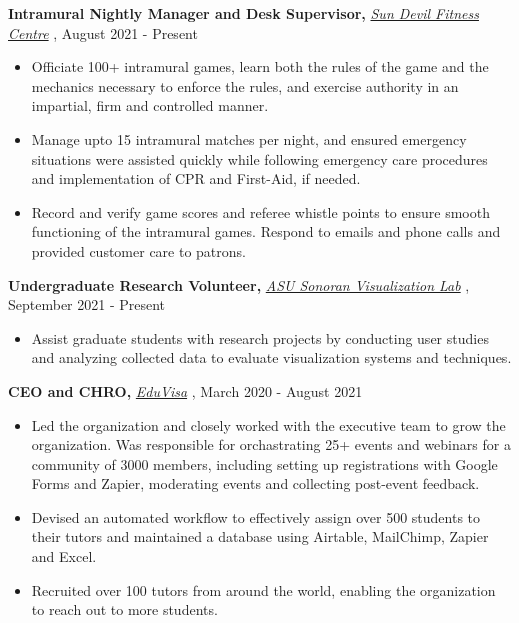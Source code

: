 \documentclass[a4paper]{article}
\begin{document}
    \textbf{Intramural Nightly Manager and Desk Supervisor, } \textit{{\href{https://fitness.asu.edu/programs/intramurals}{Sun Devil Fitness Centre}} \faExternalLink},   \hfill August 2021 - Present\\
\vspace{-3mm}
\begin{itemize}
    \itemsep-0.05em
    \item Officiate 100+ intramural games, learn both the rules of the game and the mechanics necessary to enforce the rules, and exercise authority in an impartial, firm and controlled manner. 
    \item Manage upto 15 intramural matches per night, and ensured emergency situations were assisted quickly while following emergency care procedures and implementation of CPR and First-Aid, if needed.  
    \item Record and verify game scores and referee whistle points to ensure smooth functioning of the intramural games. Respond to emails and phone calls and provided customer care to patrons.
\end{itemize}



\textbf{Undergraduate Research Volunteer, } \textit{\href{https://news.asu.edu/20200225-solutions-data-driven-quest-resilient-power-systems}{ASU Sonoran Visualization Lab} \faExternalLink}, \hfill September 2021 - Present\\
\vspace{-3mm}
\begin{itemize}
    \itemsep-0.05em
    \item Assist graduate students with research projects by conducting user studies and analyzing collected data to evaluate visualization systems and techniques. 
\end{itemize}

\textbf{CEO and CHRO, }\textit{{\href{https://myeduvisa.org/}{EduVisa}} \faExternalLink},   \hfill March 2020 - August 2021\\
\vspace{-3mm}
\begin{itemize} \itemsep 1pt
    \itemsep-0.05em
	\item Led the organization and closely worked with the executive team to grow the organization. Was responsible for orchastrating 25+ events and webinars for a community of 3000 members, including setting up registrations with Google Forms and Zapier, moderating events and collecting post-event feedback.
	\item Devised an automated workflow to effectively assign over 500 students to their tutors and maintained a database using Airtable, MailChimp, Zapier and Excel.
	\item Recruited over 100 tutors from around the world, enabling the organization to reach out to more students.
\end{itemize}
\end{document}

